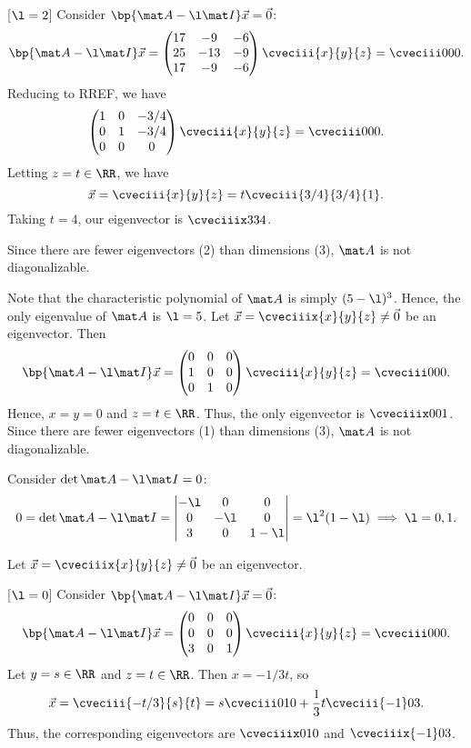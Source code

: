 \begin{solution}
\begin{ppart}
        [$\l = 2$] Consider $\bp{\mat A - \l \mat I} \vec x = \vec 0$: \[\bp{\mat A - \l \mat I} \vec x = \begin{pmatrix}17 & -9 & -6 \\ 25 & -13 & -9 \\ 17 & -9 & -6\end{pmatrix} \cveciii{x}{y}{z} = \cveciii000.\] Reducing to RREF, we have \[\begin{pmatrix}1 & 0 & -3/4 \\ 0 & 1 & -3/4 \\ 0 & 0 & 0\end{pmatrix} \cveciii{x}{y}{z} = \cveciii000.\] Letting $z = t \in \RR$, we have \[\vec x = \cveciii{x}{y}{z} = t\cveciii{3/4}{3/4}{1}.\] Taking $t = 4$, our eigenvector is $\cveciiix334$.

        Since there are fewer eigenvectors (2) than dimensions (3), $\mat A$ is not diagonalizable.
    \end{ppart}
    \begin{ppart}
        Note that the characteristic polynomial of $\mat A$ is simply $(5-\l)^3$. Hence, the only eigenvalue of $\mat A$ is $\l = 5$. Let $\vec x = \cveciiix{x}{y}{z} \neq \vec 0$ be an eigenvector. Then \[\bp{\mat A - \l \mat I} \vec x = \begin{pmatrix}0 & 0 & 0 \\ 1 & 0 & 0 \\ 0 & 1 & 0\end{pmatrix} \cveciii{x}{y}{z} = \cveciii000.\] Hence, $x = y = 0$ and $z = t \in \RR$. Thus, the only eigenvector is $\cveciiix001$. Since there are fewer eigenvectors (1) than dimensions (3), $\mat A$ is not diagonalizable.
    \end{ppart}
    \begin{ppart}
        Consider $\det{\mat A - \l \mat I} = 0$: \[0 = \det{\mat A - \l \mat I} = \begin{vmatrix}-\l & 0 & 0 \\ 0 & -\l & 0 \\ 3 & 0 & 1 - \l\end{vmatrix} = \l^2 (1-\l) \implies \l = 0, 1.\]

        Let $\vec x = \cveciiix{x}{y}{z} \neq \vec 0$ be an eigenvector.

        [$\l = 0$] Consider $\bp{\mat A - \l \mat I} \vec x = \vec 0$: \[\bp{\mat A - \l \mat I} \vec x = \begin{pmatrix}0 & 0 & 0 \\ 0 & 0 & 0 \\ 3 & 0 & 1\end{pmatrix}\cveciii{x}{y}{z} = \cveciii000.\] Let $y = s \in \RR$ and $z = t \in \RR$. Then $x = -1/3 t$, so \[\vec x = \cveciii{-t/3}{s}{t} = s \cveciii010 + \frac13 t \cveciii{-1}03.\] Thus, the corresponding eigenvectors are $\cveciiix010$ and $\cveciiix{-1}03$.


\end{ppart}
\end{solution}
